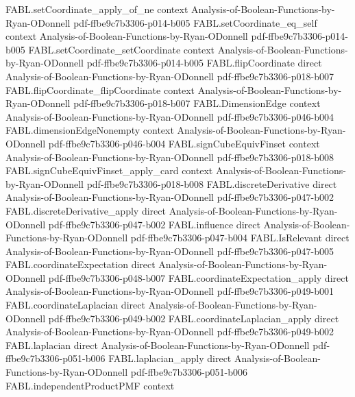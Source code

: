\begin{theorem}
\proofstep
  {FABL.setCoordinate_apply_of_ne}
  {context}
  {Analysis-of-Boolean-Functions-by-Ryan-ODonnell}
  {pdf-ffbe9c7b3306-p014-b005}
\proofstep
  {FABL.setCoordinate_eq_self}
  {context}
  {Analysis-of-Boolean-Functions-by-Ryan-ODonnell}
  {pdf-ffbe9c7b3306-p014-b005}
\proofstep
  {FABL.setCoordinate_setCoordinate}
  {context}
  {Analysis-of-Boolean-Functions-by-Ryan-ODonnell}
  {pdf-ffbe9c7b3306-p014-b005}
\proofstep
  {FABL.flipCoordinate}
  {direct}
  {Analysis-of-Boolean-Functions-by-Ryan-ODonnell}
  {pdf-ffbe9c7b3306-p018-b007}
\proofstep
  {FABL.flipCoordinate_flipCoordinate}
  {context}
  {Analysis-of-Boolean-Functions-by-Ryan-ODonnell}
  {pdf-ffbe9c7b3306-p018-b007}
\proofstep
  {FABL.DimensionEdge}
  {context}
  {Analysis-of-Boolean-Functions-by-Ryan-ODonnell}
  {pdf-ffbe9c7b3306-p046-b004}
\proofstep
  {FABL.dimensionEdgeNonempty}
  {context}
  {Analysis-of-Boolean-Functions-by-Ryan-ODonnell}
  {pdf-ffbe9c7b3306-p046-b004}
\proofstep
  {FABL.signCubeEquivFinset}
  {context}
  {Analysis-of-Boolean-Functions-by-Ryan-ODonnell}
  {pdf-ffbe9c7b3306-p018-b008}
\proofstep
  {FABL.signCubeEquivFinset_apply_card}
  {context}
  {Analysis-of-Boolean-Functions-by-Ryan-ODonnell}
  {pdf-ffbe9c7b3306-p018-b008}
\proofstep
  {FABL.discreteDerivative}
  {direct}
  {Analysis-of-Boolean-Functions-by-Ryan-ODonnell}
  {pdf-ffbe9c7b3306-p047-b002}
\proofstep
  {FABL.discreteDerivative_apply}
  {direct}
  {Analysis-of-Boolean-Functions-by-Ryan-ODonnell}
  {pdf-ffbe9c7b3306-p047-b002}
\proofstep
  {FABL.influence}
  {direct}
  {Analysis-of-Boolean-Functions-by-Ryan-ODonnell}
  {pdf-ffbe9c7b3306-p047-b004}
\proofstep
  {FABL.IsRelevant}
  {direct}
  {Analysis-of-Boolean-Functions-by-Ryan-ODonnell}
  {pdf-ffbe9c7b3306-p047-b005}
\proofstep
  {FABL.coordinateExpectation}
  {direct}
  {Analysis-of-Boolean-Functions-by-Ryan-ODonnell}
  {pdf-ffbe9c7b3306-p048-b007}
\proofstep
  {FABL.coordinateExpectation_apply}
  {direct}
  {Analysis-of-Boolean-Functions-by-Ryan-ODonnell}
  {pdf-ffbe9c7b3306-p049-b001}
\proofstep
  {FABL.coordinateLaplacian}
  {direct}
  {Analysis-of-Boolean-Functions-by-Ryan-ODonnell}
  {pdf-ffbe9c7b3306-p049-b002}
\proofstep
  {FABL.coordinateLaplacian_apply}
  {direct}
  {Analysis-of-Boolean-Functions-by-Ryan-ODonnell}
  {pdf-ffbe9c7b3306-p049-b002}
\proofstep
  {FABL.laplacian}
  {direct}
  {Analysis-of-Boolean-Functions-by-Ryan-ODonnell}
  {pdf-ffbe9c7b3306-p051-b006}
\proofstep
  {FABL.laplacian_apply}
  {direct}
  {Analysis-of-Boolean-Functions-by-Ryan-ODonnell}
  {pdf-ffbe9c7b3306-p051-b006}
\proofstep
  {FABL.independentProductPMF}
  {context}

\end{theorem}
